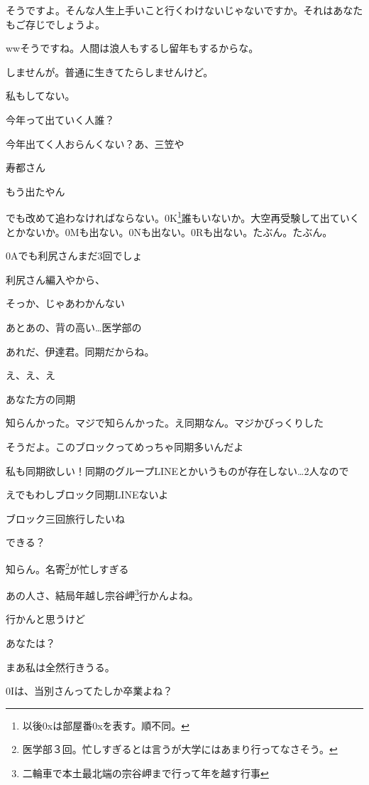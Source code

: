 \begin{multicols}{3}
そうですよ。そんな人生上手いこと行くわけないじゃないですか。それはあなたもご存じでしょうよ。

wwそうですね。人間は浪人もするし留年もするからな。

しませんが。普通に生きてたらしませんけど。

私もしてない。

今年って出ていく人誰？

今年出てく人おらんくない？あ、三笠や

寿都さん

もう出たやん

でも改めて追わなければならない。0K\footnote{以後0xは部屋番0xを表す。順不同。}誰もいないか。大空再受験して出ていくとかないか。0Mも出ない。0Nも出ない。0Rも出ない。たぶん。たぶん。

0Aでも利尻さんまだ3回でしょ

利尻さん編入やから、

そっか、じゃあわかんない

あとあの、背の高い…医学部の

あれだ、伊達君。同期だからね。

え、え、え

あなた方の同期

知らんかった。マジで知らんかった。え同期なん。マジかびっくりした

そうだよ。このブロックってめっちゃ同期多いんだよ

私も同期欲しい！同期のグループLINEとかいうものが存在しない…2人なので

えでもわしブロック同期LINEないよ

ブロック三回旅行したいね

できる？

知らん。名寄\footnote{医学部３回。忙しすぎるとは言うが大学にはあまり行ってなさそう。}が忙しすぎる

あの人さ、結局年越し宗谷岬\footnote{二輪車で本土最北端の宗谷岬まで行って年を越す行事}行かんよね。

行かんと思うけど

あなたは？

まあ私は全然行きうる。

0Iは、当別さんってたしか卒業よね？


\end{multicols}
